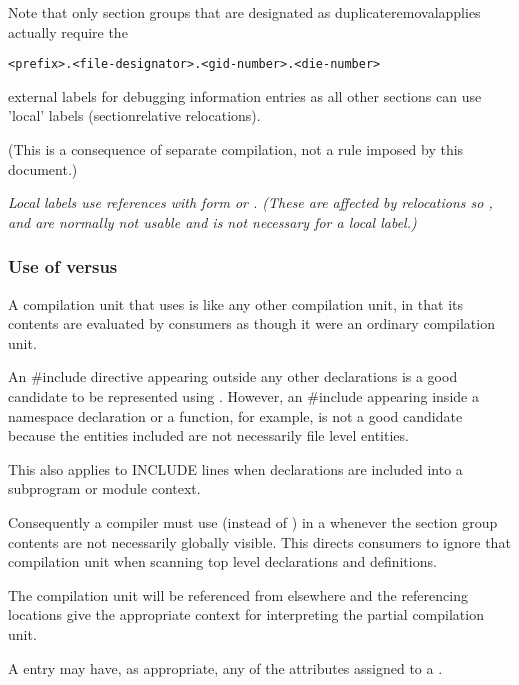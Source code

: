 Note that only 
section groups that are designated as
duplicate\dash removal\dash applies actually require the
\begin{alltt}
    <prefix>.<file-designator>.<gid-number>.<die-number>
\end{alltt}
external labels for debugging information entries as all other
 sections can use 'local' labels 
(section\dash relative
relocations).

(This is a consequence of separate compilation, not a rule
imposed by this document.)

\textit{Local labels use references with form \DWFORMreffour{}
or 
\DWFORMrefeight. 
(These are affected by relocations
so 
\DWFORMrefudata, 
\DWFORMrefone{} and 
\DWFORMreftwo{} are
normally not usable and 
\DWFORMrefaddr{} is not necessary
for a local label.)}


\subsubsection{Use of  versus 
}

A  compilation unit that uses 
\DWTAGcompileunit{}
is like any other compilation unit, in that its contents
are evaluated by consumers as though it were an ordinary
compilation unit.

An \#include directive appearing outside any other
declarations is a good candidate to be represented using
\DWTAGcompileunit. 
However, an \#include appearing inside
a  namespace declaration or a function, for example, is
not a good candidate because the entities included are not
necessarily file level entities.

This also applies to  INCLUDE lines when declarations
are included into a subprogram or module context.

Consequently a compiler must use \DWTAGpartialunit{} (instead
of \DWTAGcompileunit) 
in a  
whenever the section group 
contents are not necessarily globally visible. 
This
directs consumers to ignore that compilation unit when scanning
top level declarations and definitions.

The \DWTAGpartialunit{} compilation unit will be referenced
from elsewhere and the referencing locations give the
appropriate context for interpreting the partial compilation
unit.

A \DWTAGpartialunit{} entry may have, as appropriate, any of
the attributes assigned to a \DWTAGcompileunit.


